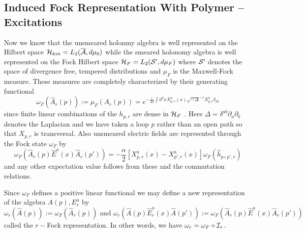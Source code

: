 \documentclass[12pt]{report}
\def\be{\begin{equation}}
\def\ee{\end{equation}}
\def\a{{\cal A}}
\def\ab{\overline{\a}}
\begin{document}
\subsection{Induced Fock Representation With Polymer -- Excitations}
\label{s3.6.2}


Now we know that the unsmeared holonmy algebra is well represented
on the Hilbert space ${\cal H}_{kin}=L_2(\ab,d\mu_0)$ while the
smeared holonomy algebra is well represented on the
Fock Hilbert space ${\cal H}_F=L_2({\cal S}',d\mu_F)$ where
${\cal S}'$ denotes the space of divergence free, tempered distributions
and $\mu_F$ is the Maxwell-Fock measure. These measures are
completely characterized by their generating functional
\be \label{3.6.9}
\omega_F(\hat{A}_r(p)):=\mu_F(A_r(p))=
e^{-\frac{1}{4\alpha}\int d^3x X^a_{p,r}(x)\sqrt{-\Delta}^{-1}
X^b_{p,r}\delta_{ab}}
\ee
since finite linear combinations of the $h_{p,r}$ are dense
in ${\cal H}_F$ \cite{69}. Here $\Delta=\delta^{ab}\partial_a\partial_b$
denotes the Laplacian and 
we have taken a loop $p$ rather than an open path so that
$X_{p,r}$ is transversal.
Also unsmeared electric fields are represented through the Fock
state $\omega_F$ by
\be \label{3.6.10}
\omega_F(\hat{A}_r(p)\hat{E}^a(x)\hat{A}_r(p'))
=-\frac{\alpha}{2}[X^a_{p,r}(x)-X^a_{p',r}(x)]
\omega_F(\hat{h}_{p\circ p',r})
\ee
and any other expectation value follows from these and the
commutation relations.

Since $\omega_F$ defines a positive linear functional we may
define a new representation of the algebra $A(p),E^a_r$
by
\be \label{3.6.11}
\omega_r(\hat{A}(p)):=\omega_F(\hat{A}_r(p))
\mbox{ and }
\omega_r(\hat{A}(p)\hat{E}^a_r(x)\hat{A}(p'))
:=\omega_F(\hat{A}_r(p)\hat{E}^a(x)\hat{A}_r(p'))
\ee
called the $r-$Fock representation. In other words, we have 
$\omega_r=\omega_F\circ {\cal I}_r$.
\end{document}
